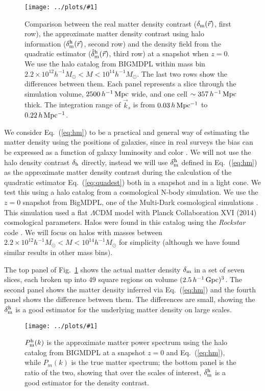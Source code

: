 \documentclass[prd,amsmath,amssymb,floatfix,superscriptaddress,nofootinbib,twocolumn]{revtex4-1}
\newcommand{\vrr}{\vec{r}}
\newcommand{\vk}{\vec{k}}
\newcommand{\ec}[1]{Eq.~(\ref{eq:#1})}
\newcommand{\rf}[1]{\ref{fig:#1}}
\newcommand{\sfig}[2]{
\texttt{[image: ../plots/\#1]}
        }
\newcommand{\Sfig}[2]{
   \begin{figure}[thbp]
   \begin{center}
    \sfig{../plots/#1.pdf}{\columnwidth}
    \caption{{\small #2}}
    \label{fig:#1}
     \end{center}
   \end{figure}
}
\newcommand\dmh{\delta_{\rm m}^{\rm h}}
\newcommand\hdmh{\hat{\delta}_{\rm m}^{\rm h}}
\begin{document}
\Sfig{real_snap}{Comparison between the real matter density contrast ($\delta_{\rm m}(\vrr)$, first row), the approximate matter density contrast using halo information ($\dmh(\vrr)$, second row) and the density field from the quadratic estimator ($\hdmh(\vrr)$, third row) at a snapshot when $z=0$. We use the halo catalog from BIGMDPL within mass bin $2.2 \times 10^{12}h^{-1}M_{\odot}<M < 10^{14}h^{-1}M_{\odot}$. The last two rows show the differences between them. Each panel represents a slice through the simulation volume, $2500\,h^{-1}\rm \, Mpc$ wide, and one cell $\sim 357\,h^{-1}\rm \, Mpc$ thick. The integration range of $\vk_{s}$ is from $0.03\, h \rm \, Mpc^{-1}$ to $0.22\, h \rm \, Mpc^{-1}$.}

We consider \ec{hm} to be a practical and general way of estimating the matter density using the positions of galaxies, since in real surveys the bias can be expressed as a function of galaxy luminosity and color \cite{Cresswell:2008Col}. We will not use the halo density contrast $\delta_{\rm h}$ directly, instead we will use $\dmh$ defined in \ec{hm} as the approximate matter density contrast during the calculation of the quadratic estimator \ec{quadest} both in a snapshot and in a light cone.
We test this using a halo catalog from a cosmological N-body simulation. We use the $z=0$ snapshot from BigMDPL, one of the Multi-Dark cosmological simulations \cite{Klypin:2014nov}. This simulation used a flat $\Lambda$CDM model with Planck Collaboration XVI (2014) \cite{Planck:2014cos} cosmological parameters. Halos were found in this catalog using the \textit{Rockstar} code \cite{Behroozi:2013Rock}. We will focus on halos with masses between $2.2 \times 10^{12}h^{-1}M_{\odot}<M < 10^{14}h^{-1}M_{\odot}$ for simplicity (although we have found similar results in other mass bins).

The top panel of Fig.~\rf{real_snap} shows the actual matter density $\delta_{\rm m}$ in a set of seven slices, each broken up into 49 square regions on volume $(2.5\, h^{-1}\rm\, Gpc)^3$. The second panel shows the matter density inferred via \ec{hm} and the fourth panel shows the difference between them. The differences are small, showing the $\dmh$ is a good estimator for the underlying matter density on large scales.

\Sfig{hm}{$P_{\rm m}^{\rm h}(k)$ is the approximate matter power spectrum using the halo catalog from BIGMDPL at a snapshot $z=0$ and \ec{hm}, while $P_m(k)$ is the true matter spectrum; the bottom panel is the ratio of the two, showing that over the scales of interest, $\dmh$ is a good estimator for the density contrast.}
\end{document}
